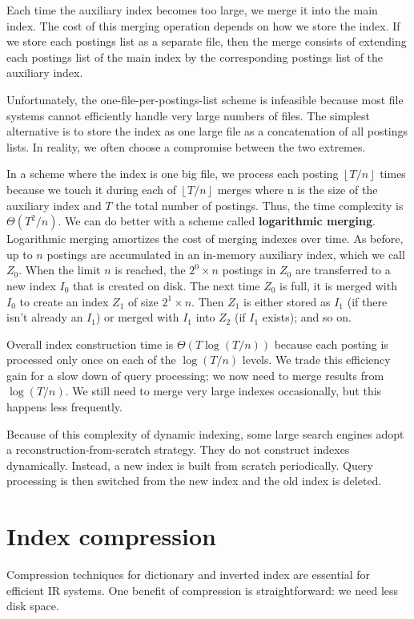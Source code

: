 \documentclass[letterpaper,11pt]{article}
\begin{document}
Each time the auxiliary index becomes too large, we merge it into the main index. The cost of this merging operation depends on how we store the index. If we store each postings list as a separate file, then the merge consists of extending each postings list of the main index by the corresponding postings list of the auxiliary index.

Unfortunately, the one-file-per-postings-list scheme is infeasible because most file systems cannot efficiently handle very large numbers of files. The simplest alternative is to store the index as one large file as a concatenation of all postings lists. In reality, we often choose a compromise between the two extremes.

In a scheme where the index is one big file, we process each posting $\left \lfloor{T/n}\right \rfloor$ times because we touch it during each of $\left \lfloor{T/n}\right \rfloor$ merges where n is the size of the auxiliary index and $T$ the total number of postings. Thus, the time complexity is $\Theta(T^2/n)$. We can do better with a scheme called \textbf{logarithmic merging}. Logarithmic merging amortizes the cost of merging indexes over time. As before, up to $n$ postings are accumulated in an in-memory auxiliary index, which we call $Z_0$. When the limit $n$ is reached, the $2^0 \times n$ postings in $Z_0$ are transferred to a new index $I_0$ that is created on disk. The next time $Z_0$ is full, it is merged with $I_0$ to create an index $Z_1$ of size $2^1 \times n$. Then $Z_1$ is either stored as $I_1$ (if there isn’t already an $I_1$) or merged with $I_1$ into $Z_2$ (if $I_1$ exists); and so on.

Overall index construction time is $\Theta(T \log(T/n))$ because each posting is processed only once on each of the $\log(T/n)$ levels. We trade this efficiency gain for a slow down of query processing; we now need to merge results from $\log(T/n)$. We still need to merge very large indexes occasionally, but this happens less frequently.

Because of this complexity of dynamic indexing, some large search engines adopt a reconstruction-from-scratch strategy. They do not construct indexes dynamically. Instead, a new index is built from scratch periodically. Query processing is then switched from the new index and the old index is deleted.

\section{Index compression}
Compression techniques for dictionary and inverted index are essential for efficient IR systems. One benefit of compression is straightforward: we need less disk space. 
\end{document}
